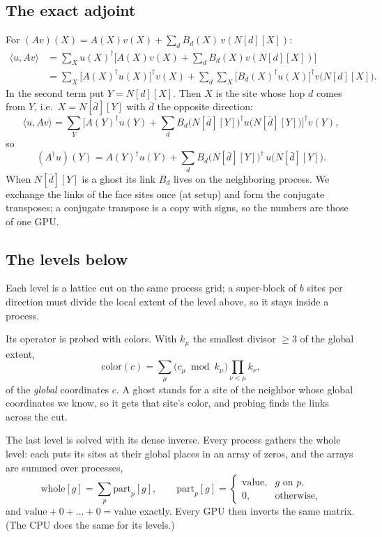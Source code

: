 \documentclass[11pt,a4paper]{article}
\numberwithin{equation}{section}
\newcommand{\dg}{^{\dagger}}
\begin{document}
\subsection{The exact adjoint}

For $(Av)(X)=A(X)v(X)+\sum_d B_d(X)\,v(N[d][X])$:
\begin{align}
\langle u, Av\rangle &= \sum_X u(X)\dg\Big[A(X)v(X) + \sum_d B_d(X)v(N[d][X])\Big]\\
&= \sum_X \big[A(X)\dg u(X)\big]\dg v(X) + \sum_d\sum_X \big[B_d(X)\dg u(X)\big]\dg v\big(N[d][X]\big).
\end{align}
In the second term put $Y=N[d][X]$. Then $X$ is the site whose hop $d$ comes from $Y$, i.e.\
$X=N[\bar d][Y]$ with $\bar d$ the opposite direction:
\begin{equation}
\langle u, Av\rangle = \sum_Y \Big[A(Y)\dg u(Y) + \sum_d B_d\big(N[\bar d][Y]\big)\dg u\big(N[\bar d][Y]\big)\Big]\dg v(Y),
\end{equation}
so
\begin{equation}
(A\dg u)(Y) = A(Y)\dg u(Y) + \sum_d B_d\big(N[\bar d][Y]\big)\dg\,u\big(N[\bar d][Y]\big).
\end{equation}
When $N[\bar d][Y]$ is a ghost its link $B_d$ lives on the neighboring process. We exchange the
links of the face sites once (at setup) and form the conjugate transposes; a conjugate transpose
is a copy with signs, so the numbers are those of one GPU.

\subsection{The levels below}

Each level is a lattice cut on the same process grid; a super-block of $b$ sites per direction must
divide the local extent of the level above, so it stays inside a process.

Its operator is probed with colors. With $k_\mu$ the smallest divisor $\ge3$ of the global extent,
\begin{equation}
\text{color}(c) = \sum_\mu \big(c_\mu \bmod k_\mu\big)\prod_{\nu<\mu}k_\nu,
\end{equation}
of the \emph{global} coordinates $c$. A ghost stands for a site of the neighbor whose global
coordinates we know, so it gets that site's color, and probing finds the links across the cut.

The last level is solved with its dense inverse. Every process gathers the whole level: each puts
its sites at their global places in an array of zeros, and the arrays are summed over processes,
\begin{equation}
\text{whole}[g] = \sum_{p} \text{part}_p[g],\qquad
\text{part}_p[g] = \begin{cases}\text{value}, & g\text{ on }p,\\ 0, & \text{otherwise},\end{cases}
\end{equation}
and $\text{value}+0+\dots+0=\text{value}$ exactly. Every GPU then inverts the same matrix. (The CPU
does the same for its levels.)
\end{document}
